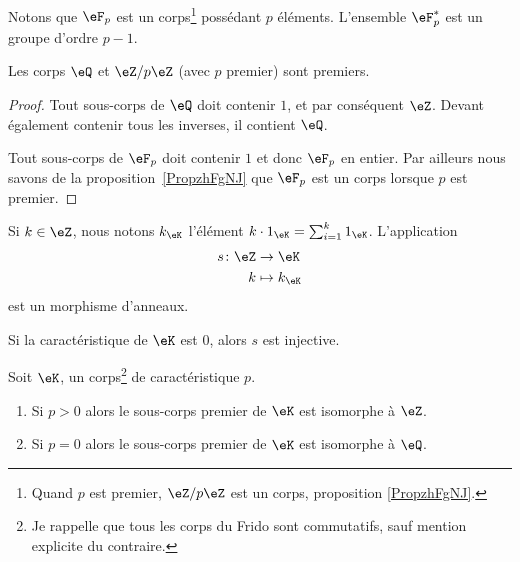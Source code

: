 Notons que \( \eF_p\) est un corps\footnote{Quand \( p\) est premier, \( \eZ/p\eZ\) est un corps, proposition \ref{PropzhFgNJ}.} possédant \( p\) éléments. L'ensemble \( \eF_p^*\) est un groupe d'ordre \( p-1\).

\begin{lemma}
	Les corps \( \eQ\) et \( \eZ/p\eZ\) (avec \( p\) premier) sont premiers.
\end{lemma}

\begin{proof}
	Tout sous-corps de \( \eQ\) doit contenir \( 1\), et par conséquent \( \eZ\). Devant également contenir tous les inverses, il contient \( \eQ\).

	Tout sous-corps de \(\eF_p \) doit contenir \( 1\) et donc \( \eF_p\) en entier. Par ailleurs nous savons de la proposition~\ref{PropzhFgNJ} que \( \eF_p\) est un corps lorsque \( p\) est premier.
\end{proof}


\begin{lemma}       \label{LEMooCGIYooSwOmHG}
	Si \( k\in \eZ\), nous notons \( k_{\eK}\) l'élément \( k\cdot 1_{\eK}=\sum_{i=1}^k1_{\eK}\). L'application
	\begin{equation}
		\begin{aligned}
			s\colon \eZ & \to \eK         \\
			k           & \mapsto k_{\eK}
		\end{aligned}
	\end{equation}
	est un morphisme d'anneaux.

	Si la caractéristique de \( \eK\) est \( 0\), alors \( s\) est injective.
\end{lemma}

\begin{proposition}     \label{PROPooXLLOooIAhEue}
	Soit \( \eK\), un corps\footnote{Je rappelle que tous les corps du Frido sont commutatifs, sauf mention explicite du contraire.} de caractéristique \( p\).
	\begin{enumerate}
		\item
		      Si \( p>0\) alors le sous-corps premier de \( \eK\) est isomorphe à \( \eZ\).
		\item
		      Si \( p=0\) alors le sous-corps premier de \( \eK\) est isomorphe à \( \eQ\).
	\end{enumerate}
\end{proposition}

